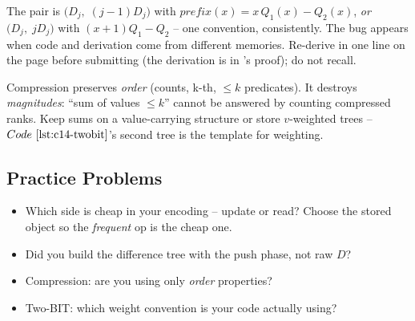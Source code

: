 \begin{warningbox}
The pair is \(\big(D_j,\;(j{-}1)D_j\big)\) with
\(\mathit{prefix}(x)=x\,Q_1(x)-Q_2(x)\), \emph{or} \(\big(D_j,\;jD_j\big)\)
with \((x{+}1)Q_1-Q_2\) -- one convention, consistently.  The bug appears
when code and derivation come from different memories.  Re-derive in one
line on the page before submitting (the derivation is in
's proof); do not recall.
\end{warningbox}

\begin{warningbox}
Compression preserves \emph{order} (counts, k-th, \(\le k\) predicates).  It
destroys \emph{magnitudes}: ``sum of values \(\le k\)'' cannot be answered
by counting compressed ranks.  Keep sums on a value-carrying structure or
store \(v\)-weighted trees -- \(\coderef{c14-twobit}\)'s second tree is the
template for weighting.
\end{warningbox}

\subsection{Practice Problems}

\begin{stuckbox}
\begin{itemize}[nosep,leftmargin=1.4em]
  \item Which side is cheap in your encoding -- update or read?  Choose the
        stored object so the \emph{frequent} op is the cheap one.
  \item Did you build the difference tree with the push phase, not raw \(D\)?
  \item Compression: are you using only \emph{order} properties?
  \item Two-BIT: which weight convention is your code actually using?
\end{itemize}
\end{stuckbox}

